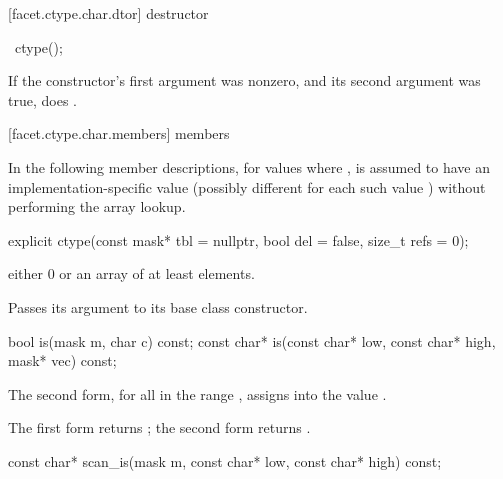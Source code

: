 [facet.ctype.char.dtor]{ destructor}

%
\begin{itemdecl}
~ctype();
\end{itemdecl}

\begin{itemdescr}
\pnum
\effects
If the constructor's first argument was nonzero, and its second argument
was true, does
.
\end{itemdescr}

[facet.ctype.char.members]{ members}

\pnum
{}%
In the following member descriptions, for
values  where ,
 is assumed to have an
implementation-specific value (possibly different for each
such value ) without performing the array lookup.

%
\begin{itemdecl}
explicit ctype(const mask* tbl = nullptr, bool del = false,
               size_t refs = 0);
\end{itemdecl}

\begin{itemdescr}
\pnum
\precondition
{} either 0 or an array of at least
elements.

\pnum
\effects
Passes its  argument to its base class constructor.
\end{itemdescr}

%
\begin{itemdecl}
bool        is(mask m, char c) const;
const char* is(const char* low, const char* high,
               mask* vec) const;
\end{itemdecl}

\begin{itemdescr}
\pnum
\effects
The second form, for all
in the range
,
assigns
into
the value
.

\pnum
\returns
The first form returns
;
the second form returns .
\end{itemdescr}

%
\begin{itemdecl}
const char* scan_is(mask m,
                    const char* low, const char* high) const;
\end{itemdecl}


